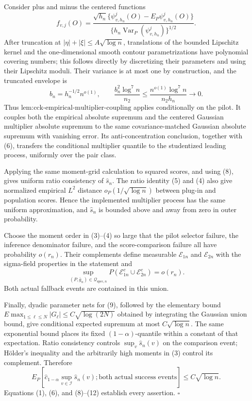 Consider plus and minus the centered functions
\[
 f_{v,j}(O)=\frac{\sqrt{h_n}\{\psi^j_{v,h_n}(O)-E_P\psi^j_{v,h_n}(O)\}}
 {\{h_n\operatorname{Var}_P(\psi^j_{v,h_n})\}^{1/2}}. \tag{9}
\]
After truncation at \(|\eta|+|\xi|\le A\sqrt{\log n}\), translations of the bounded Lipschitz kernel and the one-dimensional smooth contour parametrizations have polynomial covering numbers; this follows directly by discretizing their parameters and using their Lipschitz moduli.  Their variance is at most one by construction, and the truncated envelope is
\[
 b_n=h_n^{-1/2}n^{o(1)},
 \qquad
 \frac{b_n^2\log^7n}{n_2}
 \le\frac{n^{o(1)}\log^7n}{n_2h_n}\longrightarrow0. \tag{10}
\]
Thus \(\text{lem:cck-empirical-multiplier-coupling}\) applies conditionally on the pilot.  It couples both the empirical absolute supremum and the centered Gaussian multiplier absolute supremum to the same covariance-matched Gaussian absolute supremum with vanishing error.  Its anti-concentration conclusion, together with (6), transfers the conditional multiplier quantile to the studentized leading process, uniformly over the pair class.

Applying the same moment-grid calculation to squared scores, and using (8), gives uniform ratio consistency of \(\widehat s_n\).  The ratio identity (5) and (4) also give normalized empirical \(L^2\) distance \(o_P(1/\sqrt{\log n})\) between plug-in and population scores.  Hence the implemented multiplier process has the same uniform approximation, and \(\widehat s_n\) is bounded above and away from zero in outer probability.

Choose the moment order in (3)--(4) so large that the pilot selector failure, the inference denominator failure, and the score-comparison failure all have probability \(o(r_n)\).  Their complements define measurable \(\mathcal E_{1n}\) and \(\mathcal E_{2n}\) with the sigma-field properties in the statement and
\[
 \sup_{(P,\bar g_n)\in\mathcal Q_{\mathrm{spec},n}}
 P(\mathcal E_{1n}^c\cup\mathcal E_{2n}^c)=o(r_n). \tag{11}
\]
Both actual fallback events are contained in this union.

Finally, dyadic parameter nets for (9), followed by the elementary bound
\(E\max_{1\le\ell\le N}|G_\ell|\le C\sqrt{\log(2N)}\) obtained by integrating the Gaussian union bound, give conditional expected supremum at most \(C\sqrt{\log n}\).  The same exponential bound places its fixed \((1-\alpha)\)-quantile within a constant of that expectation.  Ratio consistency controls \(\sup_v\widehat s_n(v)\) on the comparison event; H\"older's inequality and the arbitrarily high moments in (3) control its complement.  Therefore
\[
 E_P\!\left[
 \widehat c_{1-\alpha}\sup_{v\in\mathcal I}\widehat s_n(v);
 \text{both actual success events}\right]
 \le C\sqrt{\log n}. \tag{12}
\]
Equations (1), (6), and (8)--(12) establish every assertion. \(\square\)